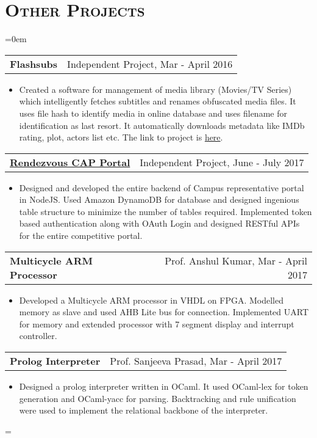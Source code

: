 \documentclass{article}
\makeatletter
\newenvironment{longversion}{}{} %
\newenvironment{absolutelynopagebreak}
  {\par\nobreak\vfil\penalty0\vfilneg
   \vtop\bgroup}
  {\par\xdef\tpd{\the\prevdepth}\egroup
   \prevdepth=\tpd}
\newcommand{\headerrow}[2]
{\begin{tabular*}{\linewidth}{l@{\extracolsep{\fill}}r}
	#1 &
	#2 \\
\end{tabular*}}
\newcommand{\tmpsection}[1]{}
\let\tmpsection=\section
\renewcommand{\section}[1]{\tmpsection*{\textsc{#1}}}
\makeatother
\begin{document}
\begin{absolutelynopagebreak}
\begin{longversion}
\section{Other Projects}
\begin{list} {}{\leftmargin=0em}
\setlength{\leftmargin}{0pt}

\item[]
\headerrow {\textbf{Flashsubs}} {Independent Project, Mar - April 2016}
\begin{itemize} \item[]
Created a software for management of media library (Movies/TV Series) which intelligently fetches subtitles and renames obfuscated media files. It uses file hash to identify media in online database and uses filename for identification as last resort. It automatically downloads metadata like IMDb rating, plot, actors list etc. The link to project is \href{https://github.com/ozym4nd145/FlashSubs}{here}.
\end{itemize}

\headerrow {\textbf{\href{http://cap.rdv-iitd.com}{Rendezvous CAP Portal}}} {Independent Project, June - July 2017}
\begin{itemize} \item[]
Designed and developed the entire backend of Campus representative portal in NodeJS. Used Amazon DynamoDB for database and designed ingenious table structure to minimize the number of tables required. Implemented token based authentication along with OAuth Login and designed RESTful APIs for the entire competitive portal.
\end{itemize}


\item[]
\headerrow {\textbf{Multicycle ARM Processor}}{Prof. Anshul Kumar, Mar - April 2017}
\begin{itemize} \item[]
Developed a Multicycle ARM processor in VHDL on FPGA. Modelled memory as slave and used AHB Lite bus for connection. Implemented UART for memory and extended processor with 7 segment display and interrupt controller.
\end{itemize}

\item[]
\headerrow {\textbf{Prolog Interpreter}}{Prof. Sanjeeva Prasad, Mar - April 2017}
\begin{itemize} \item[] 
Designed a prolog interpreter written in OCaml. It used OCaml-lex for token generation and OCaml-yacc for parsing. Backtracking and rule unification were used to implement the relational backbone of the interpreter.
\end{itemize}


\end{list}
\end{longversion}
\end{absolutelynopagebreak}
\end{document}
